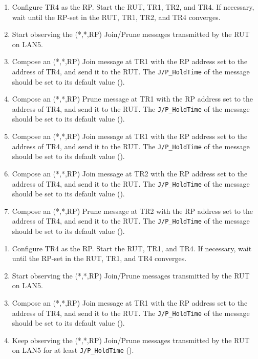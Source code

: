 \documentclass[11pt]{report}
\begin{document}
\begin{enumerate}

  \item Configure TR4 as the RP. Start the RUT, TR1, TR2, and TR4. If
  necessary, wait until the RP-set in the RUT, TR1, TR2, and TR4
  converges.

  \item Start observing the (*,*,RP) Join/Prune messages transmitted by the
  RUT on LAN5.

  \item Compose an (*,*,RP) Join message at TR1 with the RP address set to the
  address of TR4, and send it to the RUT. 
  The \verb=J/P_HoldTime= of the message should be set to its default
  value ({\PimsmJPHoldTime}).

  \item Compose an (*,*,RP) Prune message at TR1 with the RP address set to the
  address of TR4, and send it to the RUT. 
  The \verb=J/P_HoldTime= of the message should be set to its default
  value ({\PimsmJPHoldTime}).

  \item Compose an (*,*,RP) Join message at TR1 with the RP address set to the
  address of TR4, and send it to the RUT. 
  The \verb=J/P_HoldTime= of the message should be set to its default
  value ({\PimsmJPHoldTime}).

  \item Compose an (*,*,RP) Join message at TR2 with the RP address set to the
  address of TR4, and send it to the RUT. 
  The \verb=J/P_HoldTime= of the message should be set to its default
  value ({\PimsmJPHoldTime}).

  \item Compose an (*,*,RP) Prune message at TR2 with the RP address set to the
  address of TR4, and send it to the RUT. 
  The \verb=J/P_HoldTime= of the message should be set to its default
  value ({\PimsmJPHoldTime}).

\end{enumerate}


\begin{enumerate}

  \item Configure TR4 as the RP. Start the RUT, TR1, and TR4. If
  necessary, wait until the RP-set in the RUT, TR1, and TR4
  converges.

  \item Start observing the (*,*,RP) Join/Prune messages transmitted by the
  RUT on LAN5.

  \item Compose an (*,*,RP) Join message at TR1 with the RP address set to the
  address of TR4, and send it to the RUT. 
  The \verb=J/P_HoldTime= of the message should be set to its default
  value ({\PimsmJPHoldTime}).

  \item Keep observing the (*,*,RP) Join/Prune messages transmitted by the
  RUT on LAN5 for at least \verb=J/P_HoldTime= ({\PimsmJPHoldTime}).

\end{enumerate}
\end{document}
